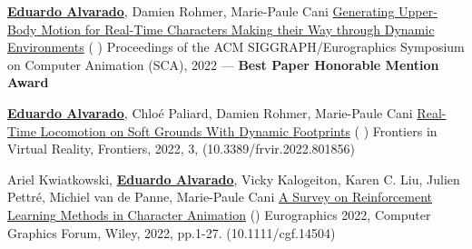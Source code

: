 \begin{cventries}
\cvpublication
    {\textbf{\underline{Eduardo Alvarado}}, Damien Rohmer, Marie-Paule Cani} %
    {\href{https://edualvarado.com/generating-upper-body-motion/} {Generating {Upper}-{Body} {Motion} for {Real}-{Time} {Characters} {Making} their {Way} through {Dynamic} {Environments}} (\href{https://github.com/edualvarado/unity-antagonistic-controller}{} \href{https://hal.inria.fr/hal-03757439v1}{} \href{https://www.youtube.com/watch?v=dq4FJH1atWM}{})} %
    {Proceedings of the ACM SIGGRAPH/Eurographics Symposium on Computer Animation (SCA), 2022 --- \colorbox{awesome!15}{\textbf{\faAward\; Best Paper Honorable Mention Award}}}

\cvpublication
    {\textbf{\underline{Eduardo Alvarado}}, Chloé Paliard, Damien Rohmer, Marie-Paule Cani} %
    {\href{https://edualvarado.com/soft-grounds/}{Real-{Time} {Locomotion} on {Soft} {Grounds} {With} {Dynamic} {Footprints}} (\href{https://github.com/edualvarado/unity-footprints}{} \href{https://hal.inria.fr/hal-03630136}{} \href{https://youtu.be/aWBntnCOwEE}{})} %
    {Frontiers in Virtual Reality, Frontiers, 2022, 3, (10.3389/frvir.2022.801856)} %

\cvpublication
    {Ariel Kwiatkowski, \textbf{\underline{Eduardo Alvarado}}, Vicky Kalogeiton, Karen C. Liu, Julien Pettr{\'{e}}, Michiel van de Panne, Marie-Paule Cani} %
    {\href{https://edualvarado.com/reinforcement-learning-methods-in-character-animation/}{A {Survey} on {Reinforcement} {Learning} {Methods} in {Character} {Animation}} (\href{https://hal.inria.fr/hal-03600947}{})} %
    {Eurographics 2022, Computer Graphics Forum, Wiley, 2022, pp.1-27. (10.1111/cgf.14504)} %

    
\end{cventries}
